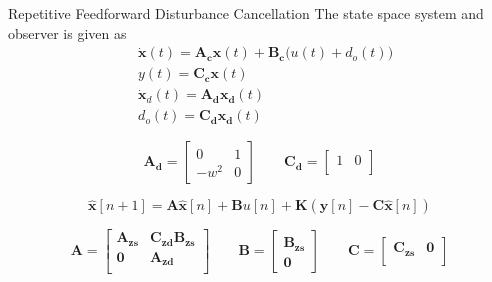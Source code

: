 \documentclass[10pt]{beamer}
\begin{document}
\begin{frame}{Repetitive Feedforward Disturbance Cancellation}
The state space system and observer is given as
  \begin{subequations}
    \label{eq:sys12}
    \begin{alignat}{2}
      \label{eq:sys1}
      & \mathbf{\dot{x}}(t) = \mathbf{A_cx}(t) + \mathbf{B_c}\big(u(t) + d_o(t)\big) \\
      \label{eq:sys2}
      & y(t) = \mathbf{C_cx}(t) \\
      \label{eq:dist1}
      & \mathbf{\dot{x}}_d(t) = \mathbf{A_dx_d}(t) \\
      \label{eq:dist2}
      & d_o(t) = \mathbf{C_dx_d}(t)
    \end{alignat}
  \end{subequations}

  \begin{equation}
    \label{eq:sinm}
    \mathbf{A_d} =
      \begin{bmatrix}
         0 & 1\\[0.3em]
         -w^2 & 0
       \end{bmatrix}
       \qquad
    \mathbf{C_d} =
      \begin{bmatrix}
          1 & 0\\
      \end{bmatrix}
  \end{equation}

  \begin{equation}
    \label{eq:obs}
    \mathbf{\hat{x}}[n + 1] = \mathbf{A\hat{x}}[n] + \mathbf{B}u[n] + \mathbf{K}(\mathbf{y}[n] - \mathbf{C\hat{x}}[n])
  \end{equation}

  \begin{equation}
    \label{eq:augumented}
    \mathbf{A} =
      \begin{bmatrix}
         \mathbf{A_{zs}} & \mathbf{C_{zd}B_{zs}}\\[0.3em]
         \mathbf{0} & \mathbf{A_{zd}}\\
       \end{bmatrix}
       \qquad
    \mathbf{B} =
      \begin{bmatrix}
          \mathbf{B_{zs}}\\
          \mathbf{0}
      \end{bmatrix}
       \qquad
    \mathbf{C} =
      \begin{bmatrix}
          \mathbf{C_{zs}} & \mathbf{0}\\
      \end{bmatrix}
  \end{equation}
\end{frame}
\end{document}
